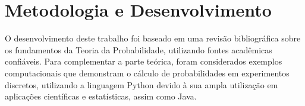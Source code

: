 \section{Metodologia e Desenvolvimento}
\label{cap:metodologiaDesenvolvimento}

O desenvolvimento deste trabalho foi baseado em uma revisão bibliográfica sobre os
fundamentos da Teoria da Probabilidade, utilizando fontes acadêmicas confiáveis. Para complementar a parte
teórica, foram considerados exemplos computacionais que demonstram o cálculo de
probabilidades em experimentos discretos, utilizando a linguagem Python devido à sua ampla
utilização em aplicações científicas e estatísticas, assim como Java.

